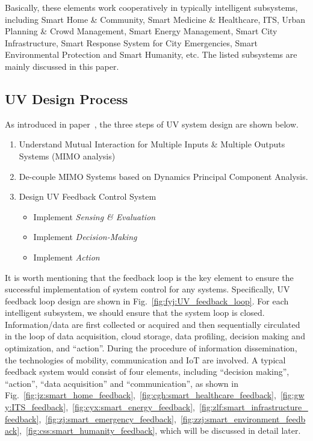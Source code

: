 \documentclass[letterpaper, twocolumn, 10pt, conference]{IEEEtran}
\begin{document}
Basically, these elements work cooperatively in typically intelligent subsystems, including Smart Home \& Community, Smart Medicine \& Healthcare, ITS, Urban Planning \& Crowd Management, Smart Energy Management, Smart City Infrastructure, Smart Response System for City Emergencies, Smart Environmental Protection and Smart Humanity, etc. The listed subsystems are mainly discussed in this paper.



\subsection{UV Design Process}
\label{ssec:UV.Design}

As introduced in paper~\cite{mit-uv2013}, the three steps of UV system design are shown below. 


\begin{enumerate}
	\item Understand Mutual Interaction for Multiple Inputs \& Multiple Outputs Systems (MIMO analysis)
	\item De-couple MIMO Systems based on Dynamics Principal Component Analysis. 
	\item Design UV Feedback Control System 
		\begin{itemize}
			\item Implement \textit{Sensing \& Evaluation}
			\item Implement \textit{Decision-Making}
			\item Implement \textit{Action}
		\end{itemize}
\end{enumerate}

It is worth mentioning that the feedback loop is the key element to ensure the successful implementation of system control for any systems. 
Specifically, UV feedback loop design are shown in Fig.~\ref{fig:fyj:UV_feedback_loop}. 
For each intelligent subsystem, we should ensure that the system loop is closed. Information/data are first collected or acquired and then sequentially circulated in the loop of data acquisition, cloud storage, data profiling, decision making and optimization, and \enquote{action}. During the procedure of information dissemination, the technologies of mobility, communication and IoT are involved.  A typical feedback system would consist of four elements, including \enquote{decision making}, \enquote{action},  \enquote{data acquisition} and \enquote{communication}, as shown in 
Fig.~\ref{fig:jz:smart_home_feedback},~\ref{fig:cgh:smart_healthcare_feedback},~\ref{fig:gwy:ITS_feedback},~\ref{fig:cyx:smart_energy_feedback},~\ref{fig:zlf:smart_infrastructure_feedback},~\ref{fig:zj:smart_emergency_feedback},~\ref{fig:zzj:smart_environment_feedback},~\ref{fig:css:smart_humanity_feedback}, which will be discussed in detail later.
\end{document}

